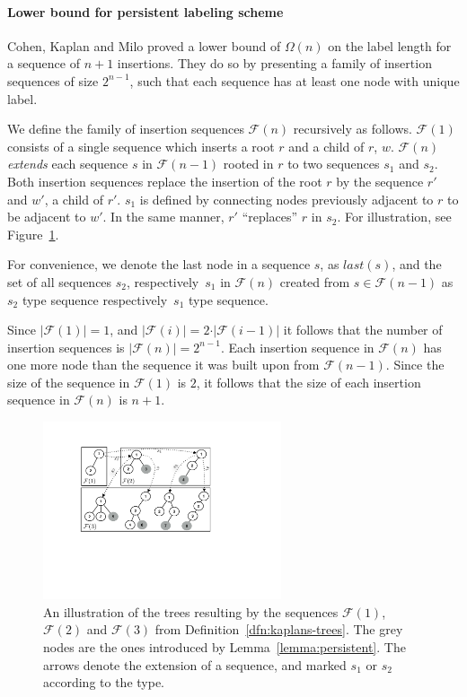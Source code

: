 			\paragraph{Lower bound for persistent \ancestry labeling scheme}
			Cohen, Kaplan and Milo  proved a lower bound of  $\Omega(n)$ on the label length for a sequence of $n+1$ insertions.
			They do so by presenting a family of insertion sequences of size $2^{n-1}$, such that each sequence has  at least one node with unique label.
			\begin{definition}\label{dfn:kaplans-trees}
			We define the family of insertion sequences $\mathcal{F}(n)$ recursively as follows.
				$\mathcal{F}(1)$ consists of a single sequence which inserts a root $r$ and a child of $r$, $w$.
				$\mathcal{F}(n)$ \textit{extends} each sequence $s$  in  $\mathcal{F}(n-1)$ rooted in $r$ to two sequences $s_1$ and $s_2$.
				Both insertion sequences replace the insertion of the root $r$ by the sequence $r'$ and $w'$,  a child of $r'$.
				$s_1$ is defined by connecting nodes previously adjacent to $r$  to be adjacent to  $w'$.
				In the same manner, $r'$ ``replaces'' $r$ in  $s_2$. 
				For illustration, see Figure~\ref{fig:KaplansTrees}.
			\end{definition}
			For convenience, we denote the last node in a sequence $s$, as $last(s)$, and the set of all sequences $s_2$, respectively~$s_1$ in $\mathcal{F}(n)$ created from $s \in \mathcal{F}(n-1)$ as  $s_2$ type sequence respectively~$s_1$ type sequence.	
			
			Since  $\vert \mathcal{F}(1) \vert = 1$, and  $\vert \mathcal{F}(i) \vert = 2 \cdot \vert \mathcal{F}(i-1) \vert $ it follows that the number of insertion sequences is $\vert \mathcal{F}(n) \vert = 2^{n-1}$.
			Each insertion sequence in $\mathcal{F}(n)$ has one more node than the sequence it was built upon from $\mathcal{F}(n-1)$. 
			Since the size of the sequence in $\mathcal{F}(1)$ is $2$, it follows that the size of each insertion sequence in $\mathcal{F}(n)$ is $n+1$.
			
			\begin{figure}[!ht] 
				\centering
				\includegraphics[width=70mm]{./Figures/Kaplans.pdf}
				\caption{ An illustration of  the trees resulting by the sequences $\mathcal{F}(1)$,  $\mathcal{F}(2)$ and  $\mathcal{F}(3)$ from Definition~\ref{dfn:kaplans-trees}. The grey nodes are the ones introduced by Lemma~\ref{lemma:persistent}.
				The arrows denote the extension of a sequence, and marked $s_1$ or $s_2$ according to the type.}
				\label{fig:KaplansTrees}
			\end{figure}
			
